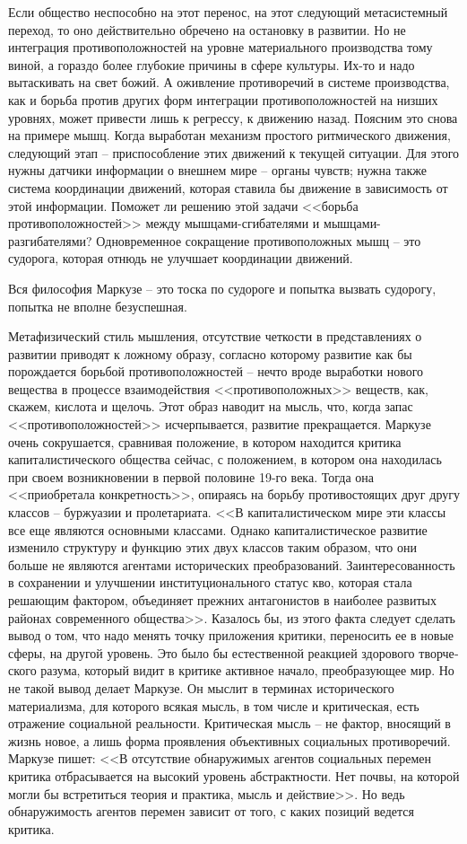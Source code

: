 \documentclass{book}
\begin{document}
Если общество неспособно на этот перенос, на этот следу­ющий метасистемный переход, то оно действительно обречено на остановку в развитии. Но не интеграция противоположно­стей на уровне материального производства тому виной, а гораз­до более глубокие причины в сфере культуры. Их-то и надо вытаскивать на свет божий. А оживление противоречий в систе­ме производства, как и борьба против других форм интегра­ции противоположностей на низших уровнях, может привести лишь к регрессу, к движению назад. Поясним это снова на при­мере мышц. Когда выработан механизм простого ритмического движения, следующий этап -- приспособление этих движений к текущей ситуации. Для этого нужны датчики информации о внешнем мире -- органы чувств; нужна также система коор­динации движений, которая ставила бы движение в зависи­мость от этой информации. Поможет ли решению этой задачи <<борьба противоположностей>> между мышцами-сгибателями и мышцами-разгибателями? Одновременное сокращение проти­воположных мышц -- это судорога, которая отнюдь 
не улучшает координации движений.

Вся философия Маркузе -- это тоска по судороге и попытка вызвать судорогу, попытка не вполне безуспешная.

Метафизический стиль мышления, отсутствие четкости в представлениях о развитии приводят к ложному образу, со­гласно которому развитие как бы порождается борьбой про­тивоположностей -- нечто вроде выработки нового вещества в процессе взаимодействия <<противоположных>> веществ, как, скажем, кислота и щелочь. Этот образ наводит на мысль, что, когда запас <<противоположностей>> исчерпывается, развитие прекращается. Маркузе очень сокрушается, сравнивая поло­жение, в котором находится критика капиталистического об­щества сейчас, с положением, в котором она находилась при своем возникновении в первой половине 19-го века. Тогда она <<приобретала конкретность>>, опираясь на борьбу противо­стоящих друг другу классов -- буржуазии и пролетариата. <<В капиталистическом мире эти классы все еще являются основ­ными классами. Однако капиталистическое развитие измени­ло структуру и функцию этих двух классов таким образом, что они больше не являются агентами исторических преобра­зований. Заинтересованность в сохранении и 
улучшении 
инсти­туционального статус кво, которая стала решающим фактором, объединяет прежних антагонистов в наиболее развитых рай­онах современного общества>>.%
Казалось бы, из этого фак­та следует сделать вывод о том, что надо менять точку прило­жения критики, переносить ее в новые сферы, на другой уро­вень. Это было бы естественной реакцией здорового творче­ского разума, который видит в критике активное начало, пре­образующее мир. Но не такой вывод делает Маркузе. Он мыслит в терминах исторического материализма, для которого всякая мысль, в том числе и критическая, есть отражение социальной реальности. Критическая мысль -- не фактор, вносящий в жизнь новое, а лишь форма проявления объективных социальных противоречий. Маркузе пишет: <<В отсутствие обнаружимых агентов социальных перемен критика отбрасывается на высо­кий уровень абстрактности. Нет почвы, на которой могли бы встретиться теория и практика, мысль и действие>>.%
Но ведь обнаружимость агентов перемен зависит от того, с каких пози­ций ведется 
критика.
 
\end{document}
